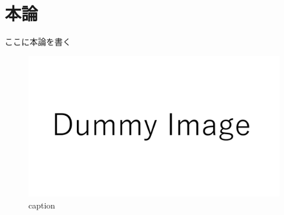 \documentclass[main]{subfiles}
\begin{document}
\chapter{本論}
ここに本論を書く\cite{ref:yao2017integrated}\cite{ref:ugarte1992curling} \cite{ref:nomura2022uwb}

\begin{figure}[htbp]
    \centering
    \includegraphics[keepaspectratio, width=\linewidth]{figures/dummy.pdf}
    \caption{caption}
    \label{fig:label}
\end{figure}
\end{document}
